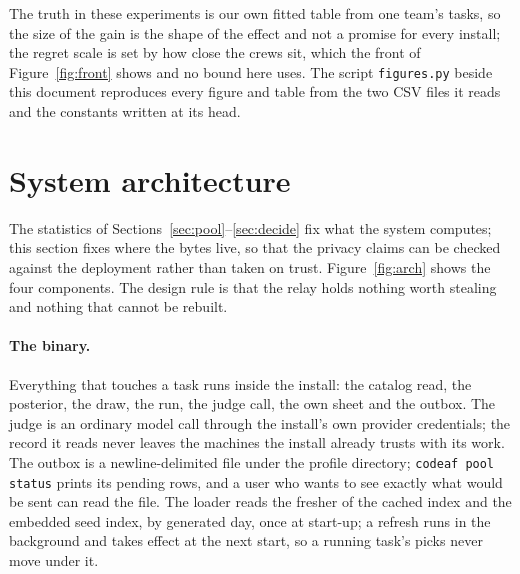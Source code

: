 \documentclass[10pt,a4paper]{article}
\newcommand{\code}[1]{\texttt{#1}}
\theoremstyle{definition}
\theoremstyle{remark}
\begin{document}
The truth in these experiments is our own fitted table from one team's tasks, so the size of the gain is the shape of the effect and not a promise for every install; the regret scale is set by how close the crews sit, which the front of Figure~\ref{fig:front} shows and no bound here uses. The script \code{figures.py} beside this document reproduces every figure and table from the two CSV files it reads and the constants written at its head.

\section{System architecture}
\label{sec:arch}

The statistics of Sections~\ref{sec:pool}--\ref{sec:decide} fix what the system computes; this section fixes where the bytes live, so that the privacy claims can be checked against the deployment rather than taken on trust. Figure~\ref{fig:arch} shows the four components. The design rule is that the relay holds nothing worth stealing and nothing that cannot be rebuilt.

\paragraph{The binary.}
Everything that touches a task runs inside the install: the catalog read, the posterior, the draw, the run, the judge call, the own sheet and the outbox. The judge is an ordinary model call through the install's own provider credentials; the record it reads never leaves the machines the install already trusts with its work. The outbox is a newline-delimited file under the profile directory; \code{codeaf pool status} prints its pending rows, and a user who wants to see exactly what would be sent can read the file. The loader reads the fresher of the cached index and the embedded seed index, by generated day, once at start-up; a refresh runs in the background and takes effect at the next start, so a running task's picks never move under it.
\end{document}
